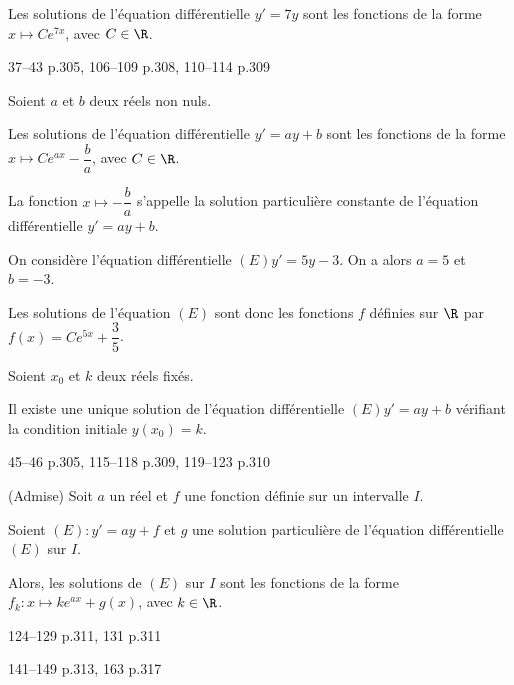 \documentclass[a4paper]{article}
\begin{document}
    \begin{example}{}{}
    Les solutions de l'équation différentielle $y'=7y$ sont les fonctions de la forme $x\mapsto Ce^{7x}$, avec $C\in\R$.
    \end{example}

    \begin{exercices}{}{}
37--43 p.305, 106--109 p.308, 110--114 p.309
    \end{exercices}

    \begin{theoreme}{}{}
      Soient $a$ et $b$ deux réels non nuls.

      Les solutions de l'équation différentielle $y'=ay+b$ sont les fonctions de la forme 
      $x \mapsto Ce^{ax}-\dfrac{b}{a}$, avec $C\in\R$.
    \end{theoreme}

    \begin{remark}{}{}
    La fonction $x\mapsto -\dfrac{b}{a}$ s'appelle la solution particulière constante de l'équation différentielle $y'=ay+b$.
    \end{remark}

    \begin{example}{}{}
      On considère l'équation différentielle $(E) y'=5y-3$. On a alors $a=5$ et $b=-3$.

      Les solutions de l'équation $(E)$ sont donc les fonctions $f$ définies sur $\R$ par $f(x)=Ce^{5x}+\dfrac{3}{5}$.
    \end{example}


    \begin{theoreme}{}{}
      Soient $x_0$ et $k$ deux réels fixés.

      Il existe une unique solution de l'équation différentielle $(E) y'=ay+b$ vérifiant la condition initiale $y(x_0)=k$.
    \end{theoreme}

    \begin{exercices}{}{}
   45--46 p.305, 115--118 p.309, 119--123 p.310
    \end{exercices}


    \begin{theoreme}{(Admise)}{}
      Soit $a$ un réel et $f$ une fonction définie sur un intervalle $I$.

      Soient $(E):y'=ay+f$ et $g$ une solution particulière de l'équation différentielle $(E)$ sur $I$.

      Alors, les solutions de $(E)$ sur $I$ sont les fonctions de la forme $f_k : x\longmapsto ke^{ax}+g(x)$, avec $k\in\R$.
    \end{theoreme}

    \begin{exercices}{}{}
      124--129 p.311, 131 p.311
      \end{exercices}
      \begin{exercices}{}{}
      141--149 p.313, 163 p.317
      \end{exercices}
\end{document}
